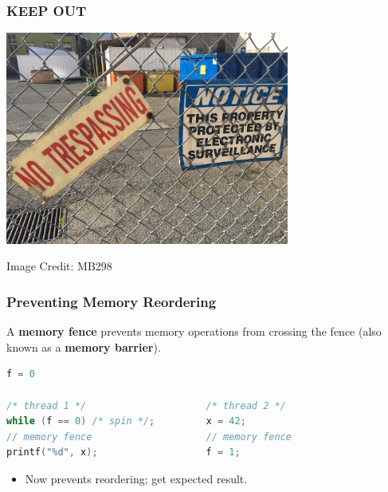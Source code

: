 \begin{frame}
\frametitle{KEEP OUT}

\begin{center}
	\includegraphics[width=0.7\textwidth]{images/No_trespassing.jpg}
\end{center}
\hfill Image Credit: MB298


\end{frame}



\begin{frame}[fragile]
  \frametitle{Preventing Memory Reordering}

  
     A {\bf memory fence} prevents memory operations from crossing the
      fence (also known as a {\bf memory barrier}).

  \begin{lstlisting}[language=C]
                         f = 0

/* thread 1 */                     /* thread 2 */
while (f == 0) /* spin */;         x = 42;
// memory fence                    // memory fence
printf("%d", x);                   f = 1;
  \end{lstlisting}

  \begin{itemize}
    \item Now prevents reordering; get expected result.
  \end{itemize}
  

\end{frame}

